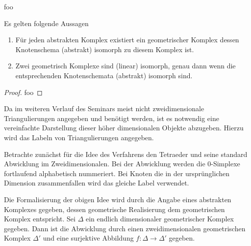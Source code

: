 \begin{Bsp}
  foo
\end{Bsp}

\begin{Satz}
  Es gelten folgende Aussagen
  \begin{enumerate}[(1)]
  \item Für jeden abstrakten Komplex existiert ein geometrischer
    Komplex dessen Knotenschema (abstrakt) isomorph zu diesem Komplex
    ist.
  \item Zwei geometrisch Komplexe sind (linear) isomorph, genau dann
    wenn die entsprechenden Knotenschemata (abstrakt) isomorph sind.
  \end{enumerate}
  \begin{proof}
    foo
  \end{proof}
\end{Satz}



\begin{Bem}
  Da im weiteren Verlauf des Seminars meist nicht zweidimensionale
  Triangulierungen angegeben und benötigt werden, ist es notwendig
  eine vereinfachte Darstellung dieser höher dimensionalen Objekte
  abzugeben. Hierzu wird das Labeln von Triangulierungen angegeben.

  Betrachte zunächst für die Idee des Verfahrens den Tetraeder und
  seine standard Abwicklung im Zweidimensionalen.
  Bei der Abwicklung werden die $0$-Simplexe fortlaufend alphabetisch
  nummeriert. Bei Knoten die in der ursprünglichen Dimension
  zusammenfallen wird das gleiche Label verwendet.

  Die Formalisierung der obigen Idee wird durch die Angabe eines
  abstrakten Komplexes gegeben, dessen geometrische Realisierung dem
  geometrischen Komplex entspricht. Sei $\Delta$ ein endlich
  dimensionaler geometrischer Komplex gegeben. Dann ist die Abwicklung
  durch einen zweidimensionalen geometrischen Komplex $\Delta'$ und
  eine surjektive Abbildung $f: \Delta \rightarrow \Delta'$ gegeben.


\end{Bem}

